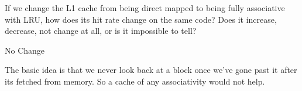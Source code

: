 \begin{blocksection}
\question
If we change the L1 cache from being direct mapped to being fully associative with LRU, how does its hit rate change on the same code? Does it increase, decrease, not change at all, or is it impossible to tell?

\begin{solution}[0.7in]
No Change

The basic idea is that we never look back at a block once we've gone past it after its fetched from memory. So a cache of any associativity would not help.
\end{solution}

\end{blocksection}
